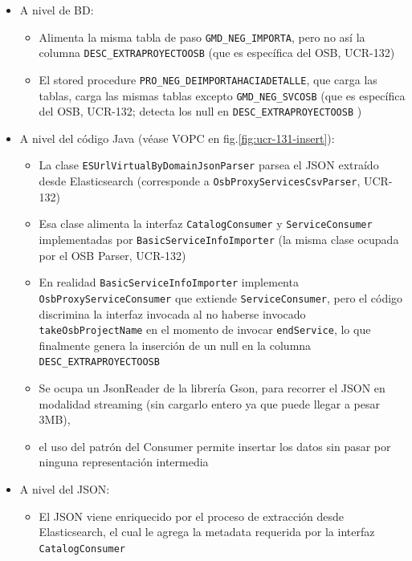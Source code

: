 \begin{itemize}
    \item A nivel de BD:
        \begin{itemize}
            \item Alimenta la misma tabla de paso \verb|GMD_NEG_IMPORTA|,
                pero no as\'i la columna \verb|DESC_EXTRAPROYECTOOSB|
                (que es espec\'ifica del OSB, UCR-132)
            \item El stored procedure \verb|PRO_NEG_DEIMPORTAHACIADETALLE|,
                que carga las tablas, 
                carga las mismas tablas excepto \verb|GMD_NEG_SVCOSB|
                (que es espec\'ifica del OSB, UCR-132;
                 detecta los null en \verb|DESC_EXTRAPROYECTOOSB|
                )
        \end{itemize}
    \item A nivel del c\'odigo Java (v\'ease VOPC en fig.\ref{fig:ucr-131-insert}):
        \begin{itemize}
            \item La clase \verb|ESUrlVirtualByDomainJsonParser| parsea 
                el JSON extra\'ido desde Elasticsearch
                (corresponde a \verb|OsbProxyServicesCsvParser|, UCR-132)
            \item Esa clase alimenta la interfaz \verb|CatalogConsumer|
                y \verb|ServiceConsumer| implementadas
                por \verb|BasicServiceInfoImporter|
                (la misma clase ocupada por el OSB Parser, UCR-132)
            \item En realidad \verb|BasicServiceInfoImporter| implementa
                \verb|OsbProxyServiceConsumer| que extiende
                \verb|ServiceConsumer|, pero el c\'odigo discrimina
                la interfaz invocada al no haberse invocado
                \verb|takeOsbProjectName| en el momento de 
                invocar \verb|endService|, lo que finalmente genera la inserci\'on
                de un null en la columna \verb|DESC_EXTRAPROYECTOOSB|
            \item Se ocupa un JsonReader de la librer\'ia Gson,
                para recorrer el JSON en modalidad streaming
                (sin cargarlo entero ya que puede llegar a pesar 3MB),
            \item
                el uso del patr\'on del Consumer permite insertar los datos
                sin pasar por ninguna representaci\'on intermedia
        \end{itemize}
    \item A nivel del JSON:
        \begin{itemize}
            \item El JSON viene enriquecido por el proceso de extracci\'on desde
                Elasticsearch, el cual le agrega la metadata requerida
                por la interfaz \verb|CatalogConsumer|
        \end{itemize}
\end{itemize}


